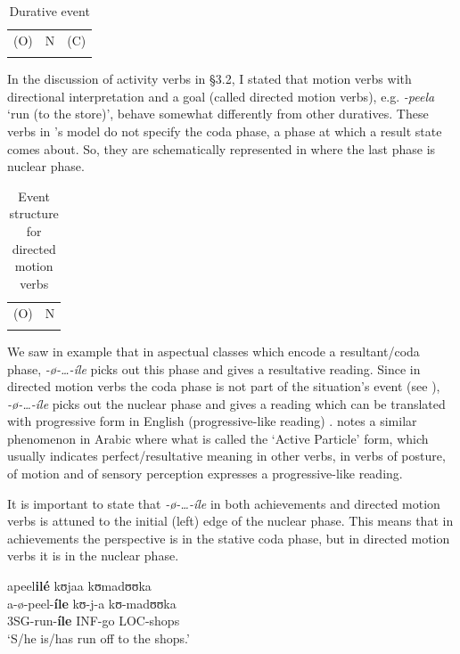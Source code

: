 \documentclass[output=paper]{langscibook}
\begin{document}
\begin{table}
\caption{Durative event}

\begin{tabularx}{\textwidth}{XXX}
\lsptoprule

(O) & N & (C)\\
\lspbottomrule
\end{tabularx}
\end{table} 

In the discussion of activity verbs in §3.2, I stated that motion verbs with directional interpretation and a goal (called directed motion verbs), e.g. \textit{-peela} ‘run (to the store)’, behave somewhat differently from other duratives. These verbs in \citeauthor{Botne2000}'s model do not specify the coda phase, a phase at which a result state comes about. So, they are schematically represented in  where the last phase is nuclear phase. 

\begin{table}
\caption{Event structure for directed motion verbs}

\begin{tabularx}{\textwidth}{XX}
\lsptoprule
(O) & N\\
\lspbottomrule
\end{tabularx}
\end{table}

We saw in example  that in aspectual classes which encode a resultant/coda phase, \textit{-ø}\textit{-…-íle} picks out this phase and gives a resultative reading. Since in directed motion verbs the coda phase is not part of the situation’s event (see ), \textit{-ø}\textit{-…-íle} picks out the nuclear phase and gives a reading which can be translated with progressive form in English (progressive-like reading) . \citet[194]{Ebert1995} notes a similar phenomenon in Arabic where what is called the ‘Active Particle’ form, which usually indicates perfect/resultative meaning in other verbs, in verbs of posture, of motion and of sensory perception expresses a progressive-like reading.

It is important to state that \textit{-ø}\textit{-…-íle} in both achievements and directed motion verbs is attuned to the initial (left) edge of the nuclear phase. This means that in achievements the perspective is in the stative coda phase, but in directed motion verbs it is in the nuclear phase.

\ea
\ea
\glll apeel\textbf{ilé}  kʊjaa kʊmadʊʊka\\
 a-ø-peel-\textbf{íle} kʊ-j-a kʊ-madʊʊka\\
   3SG-run-\textbf{íle} INF-go LOC-shops\\
 \glt ‘S/he is/has run off to the shops.’
\end{document}
